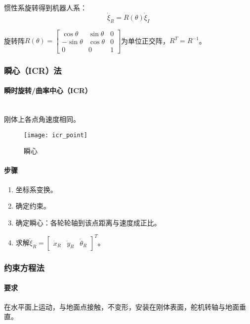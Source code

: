 \documentclass[
12pt, %
a4paper, 
oneside, %
headinclude,footinclude, %
]{scrartcl}
\begin{document}
惯性系旋转得到机器人系：
$$ \dot{\xi}_R = R(\theta) \dot{\xi}_I $$

旋转阵$ R(\theta) = \begin{bmatrix} \cos\theta & \sin\theta & 0 \\ -\sin\theta & \cos\theta & 0 \\ 0 & 0 & 1 \end{bmatrix} $为单位正交阵，$ R^T = R^{-1} $。
\subsubsection[瞬心法]{瞬心（ICR）法}
\noindent
\begin{minipage}{0.4\textwidth}
\paragraph{瞬时旋转/曲率中心（ICR）}~\\
刚体上各点角速度相同。
\begin{figure}[H]
\centering 
\texttt{[image: icr\_point]} 
\caption{瞬心}
\end{figure}
\end{minipage}
\begin{minipage}{0.6\textwidth}
\paragraph{步骤}
\begin{enumerate}
\item 坐标系变换。
\item 确定约束。
\item 确定瞬心：各轮轮轴到该点距离与速度成正比。
\item 求解$ \dot{\xi}_R = \begin{bmatrix} \dot{x}_R & \dot{y}_R & \dot{\theta}_R \end{bmatrix}^T $。
\end{enumerate}
\end{minipage}
\subsubsection[约束方程法]{约束方程法}
\paragraph{要求}
在水平面上运动，与地面点接触，不变形，安装在刚体表面，舵机转轴与地面垂直。
\end{document}
